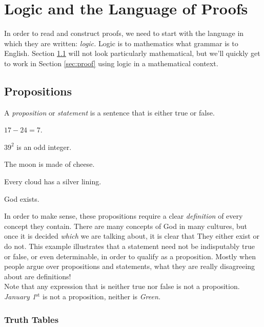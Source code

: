 \section{Logic and the Language of Proofs}\label{sec:logic}

In order to read and construct proofs, we need to start with the language in which they are written: \emph{logic.} Logic is to mathematics what grammar is to English. Section \ref{sec:prop} will not look particularly mathematical, but we'll quickly get to work in Section \ref{sec:proof} using logic in a mathematical context.

\subsection{Propositions}\label{sec:prop}

\begin{defn}
A \emph{proposition} or \emph{statement} is a sentence that is either true or false.
\end{defn}

\begin{examples}\itemsep0pt
	\item $17-24=7$.
	\item $39^2$ is an odd integer.
	\item The moon is made of cheese.
	\item Every cloud has a silver lining.
	\item God exists.
\end{examples}

\noindent In order to make sense, these propositions require a clear \emph{definition} of every concept they contain. There are many concepts of God in many cultures, but once it is decided \emph{which} we are talking about, it is clear that They either exist or do not. This example illustrates that a statement need not be indisputably true or false, or even determinable, in order to qualify as a proposition. Mostly when people argue over propositions and statements, what they are really disagreeing about are definitions!\\
Note that any expression that is neither true nor false is not a proposition. \emph{January 1$^{\text{st}}$} is not a proposition, neither is \emph{Green.}

\subsubsection*{Truth Tables}

